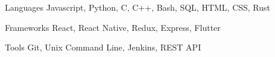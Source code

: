 

\begin{cvskills}

  \cvskill
    {Languages} %
    {Javascript, Python, C, C++, Bash, SQL, HTML, CSS, Rust} %

  \cvskill
    {Frameworks} %
    {React, React Native, Redux, Express, Flutter} %

  \cvskill
    {Tools} %
    {Git, Unix Command Line, Jenkins, REST API} %

\end{cvskills}
